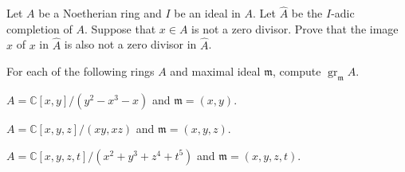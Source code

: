 \begin{problem}
Let $A$ be a Noetherian ring and $I$ be an ideal in $A$.
Let $\widehat A$ be the $I$-adic completion of $A$.
Suppose that $x\in A$ is not a zero divisor.
Prove that the image $\widehat x$ of $x$ in $\widehat A$
is also not a zero divisor in $\widehat A$.
\end{problem}
\begin{problem}
\label{prob:compute_gr}
For each of the following rings $A$ and maximal ideal $\mathfrak m$, compute $\operatorname{gr}_{\mathfrak m} A$.
\begin{alphenum}
\item $A=\mathbb C[x,y]/(y^2-x^3-x)$ and $\mathfrak m = (x,y)$.
\item $A=\mathbb C[x,y,z]/(xy, xz)$ and $\mathfrak m=(x,y,z)$.
\item $A=\mathbb C[x,y,z,t]/(x^2+y^3+z^4+t^5)$ and $\mathfrak m=(x,y,z,t)$.
\end{alphenum}
\end{problem}